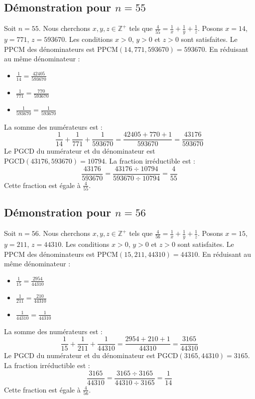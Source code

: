 \documentclass[11pt,a4paper]{article}
\begin{document}
\subsection{Démonstration pour $n = 55$}
Soit $n = 55$. Nous cherchons $x, y, z \in \mathbb{Z}^{+}$ tels que $\frac{4}{55} = \frac{1}{x} + \frac{1}{y} + \frac{1}{z}$.
Posons $x = 14$, $y = 771$, $z = 593670$.
Les conditions $x > 0$, $y > 0$ et $z > 0$ sont satisfaites.
Le PPCM des dénominateurs est $\text{PPCM}(14, 771, 593670) = 593670$.
En réduisant au même dénominateur :
\begin{itemize}
    \item $\frac{1}{14} = \frac{42405}{593670}$
    \item $\frac{1}{771} = \frac{770}{593670}$
    \item $\frac{1}{593670} = \frac{1}{593670}$
\end{itemize}
La somme des numérateurs est :
$$ \frac{1}{14} + \frac{1}{771} + \frac{1}{593670} = \frac{42405 + 770 + 1}{593670} = \frac{43176}{593670} $$
Le PGCD du numérateur et du dénominateur est $\text{PGCD}(43176, 593670) = 10794$.
La fraction irréductible est :
$$ \frac{43176}{593670} = \frac{43176 \div 10794}{593670 \div 10794} = \frac{4}{55} $$
Cette fraction est égale à $\frac{4}{55}$.

\subsection{Démonstration pour $n = 56$}
Soit $n = 56$. Nous cherchons $x, y, z \in \mathbb{Z}^{+}$ tels que $\frac{4}{56} = \frac{1}{x} + \frac{1}{y} + \frac{1}{z}$.
Posons $x = 15$, $y = 211$, $z = 44310$.
Les conditions $x > 0$, $y > 0$ et $z > 0$ sont satisfaites.
Le PPCM des dénominateurs est $\text{PPCM}(15, 211, 44310) = 44310$.
En réduisant au même dénominateur :
\begin{itemize}
    \item $\frac{1}{15} = \frac{2954}{44310}$
    \item $\frac{1}{211} = \frac{210}{44310}$
    \item $\frac{1}{44310} = \frac{1}{44310}$
\end{itemize}
La somme des numérateurs est :
$$ \frac{1}{15} + \frac{1}{211} + \frac{1}{44310} = \frac{2954 + 210 + 1}{44310} = \frac{3165}{44310} $$
Le PGCD du numérateur et du dénominateur est $\text{PGCD}(3165, 44310) = 3165$.
La fraction irréductible est :
$$ \frac{3165}{44310} = \frac{3165 \div 3165}{44310 \div 3165} = \frac{1}{14} $$
Cette fraction est égale à $\frac{4}{56}$.
\end{document}
